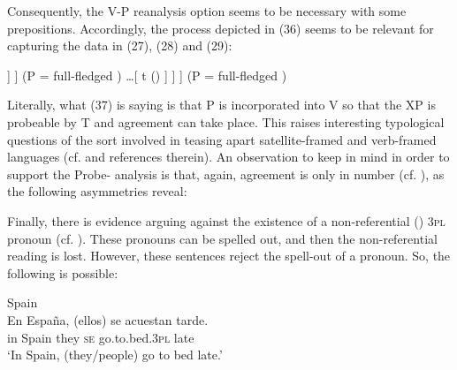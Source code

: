 \documentclass[output=paper]{langsci/langscibook}
\begin{document}
Consequently, the V-P reanalysis option seems to be necessary with some prepositions. Accordingly, the process depicted in (36) seems to be relevant for capturing the data in (27), (28) and (29):


\ea%
    \label{ex:gallego:37}
    \ea\onehalfspacing\relax [ SE \ConnectTail{\textbf{T}} ($\varphi $-Probe)  [\textsubscript{VP} V \ldots\xspace [  P \ConnectHead{\textbf{XP}} (\isi{Goal}) ] ] ] (P = full-fledged ) 
    \ex\onehalfspacing\relax [ SE \ConnectTail{\textbf{T}} ($\varphi $-Probe)  [\textsubscript{VP} [V-P] \ldots\xspace [ t   () ] ] ] (P = full-fledged )
    \z
\z


Literally, what (37) is saying is that P is incorporated into V so that the XP  is probeable by T and agreement can take place. This raises interesting typological questions of the sort involved in teasing apart satellite-framed and verb-framed languages (cf. \citealt{Mateu2012} and references therein). An observation to keep in mind in order to support the Probe- analysis is that, again, agreement is only in number (cf. \citealt{Etxepare2006}), as the following asymmetries reveal:



    \z
    
Finally, there is evidence arguing against the existence of a non-referential () \textsc{3pl} pronoun (cf. \citealt{Suñer1983,Cabredo2003}). These pronouns can be spelled out, and then the non-referential reading is lost. However, these sentences reject the spell-out of a pronoun. So, the following is possible:

\ea%
    Spain\label{ex:gallego:39}\\
    \gll En España, (ellos)  se  acuestan            tarde.    \\
         in  Spain       they   \textsc{se} go.to.bed.\textsc{3pl}   late\\
    \glt ‘In Spain, (they/people) go to bed late.’
    \z
\end{document}
